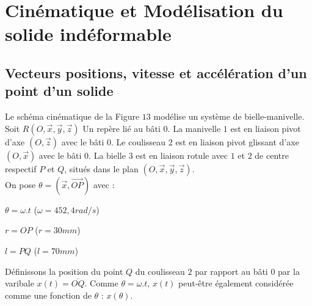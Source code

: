 \chapter{Cinématique et Modélisation du solide indéformable}
\thispagestyle{plain} %
\newpage


\section{Vecteurs positions, vitesse et accélération d'un point d'un solide}



Le schéma cinématique de la Figure $13$ modélise un système de bielle-manivelle.\\
Soit $R(O,\vec{x},\vec{y},\vec{z})$ Un repère lié au bâti $0$. La manivelle $1$ est en liaison pivot d'axe $(O,\vec{z})$ avec le bâti $0$. Le coulisseau $2$ est en liaison pivot glissant d'axe $(O,\vec{x})$ avec le bâti $0$. La bielle $3$ est en liaison rotule avec $1$ et $2$ de centre respectif $P$ et $Q$, situés dans le plan $(O,\vec{x},\vec{y},\vec{z})$.\\
On pose $\theta=(\vec{x},\overrightarrow{OP})$ avec :
\begin{description}
\item $\theta=\omega.t$ ($\omega=452,4 rad/s$)
\item $r=OP$ ($r=30 mm$)
\item $l=PQ$ ($l=70 mm$)
\end{description}
Définissons la position du point $Q$ du coulisseau $2$ par rapport au bâti $0$ par la varibale $x(t)=\overline{OQ}$. Comme $\theta=\omega.t$, $x(t)$ peut-être également considérée comme une fonction de $\theta$ : $x(\theta)$.

